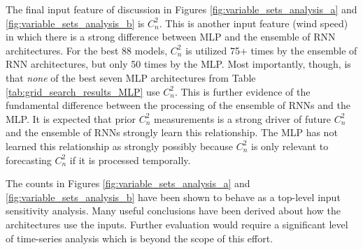 The final input feature of discussion in Figures \ref{fig:variable_sets_analysis_a} and \ref{fig:variable_sets_analysis_b} is $C_{n}^{2}$. This is another input feature (wind speed) in which there is a strong difference between \ac{MLP} and the ensemble of \ac{RNN} architectures. For the best 88 models, $C_{n}^{2}$ is utilized 75+ times by the ensemble of \ac{RNN} architectures, but only 50 times by the \ac{MLP}. Most importantly, though, is that \emph{none} of the best seven \ac{MLP} architectures from Table \ref{tab:grid_search_results_MLP} use $C_{n}^{2}$. This is further evidence of the fundamental difference between the processing of the ensemble of \ac{RNN}s and the \ac{MLP}. It is expected that prior $C_{n}^{2}$ measurements is a strong driver of future $C_{n}^{2}$ and the ensemble of \ac{RNN}s strongly learn this relationship. The \ac{MLP} has not learned this relationship as strongly possibly because $C_{n}^{2}$ is only relevant to forecasting $C_{n}^{2}$ if it is processed temporally.

The counts in Figures \ref{fig:variable_sets_analysis_a} and \ref{fig:variable_sets_analysis_b} have been shown to behave as a top-level input sensitivity analysis. Many useful conclusions have been derived about how the architectures use the inputs. Further evaluation would require a significant level of time-series analysis which is beyond the scope of this effort.

